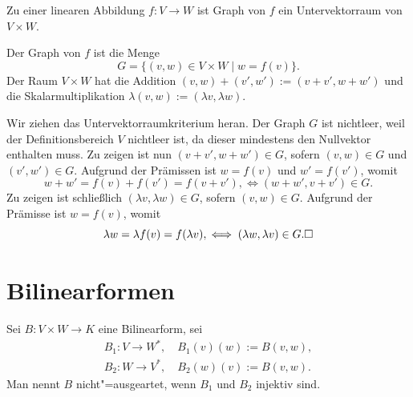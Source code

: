 \begin{Satz}
Zu einer linearen Abbildung $f\colon V\to W$ ist Graph von $f$
ein Untervektorraum von $V\times W$.
\end{Satz}
\begin{Beweis}
Der Graph von $f$ ist die Menge
\[G = \{(v,w)\in V\times W\mid w=f(v)\}.\]
Der Raum $V\times W$ hat die Addition $(v,w)+(v',w'):=(v+v',w+w')$ und
die Skalarmultiplikation $\lambda (v,w) := (\lambda v,\lambda w)$.

Wir ziehen das Untervektorraumkriterium heran. Der Graph $G$ ist
nichtleer, weil der Definitionsbereich $V$ nichtleer ist, da dieser
mindestens den Nullvektor enthalten muss. Zu zeigen ist nun
$(v+v',w+w')\in G$, sofern $(v,w)\in G$ und $(v',w')\in G$. Aufgrund
der Prämissen ist $w=f(v)$ und $w'=f(v')$, womit
\[w+w' = f(v)+f(v') = f(v+v'), \iff (w+w',v+v')\in G.\]
Zu zeigen ist schließlich $(\lambda v,\lambda w)\in G$, sofern
$(v,w)\in G$. Aufgrund der Prämisse ist $w=f(v)$, womit
\[\lambda w = \lambda f(v) = f(\lambda v), \iff (\lambda w,\lambda v)\in G.\square\]
\end{Beweis}

\newpage
\section{Bilinearformen}

\begin{Definition}%
\label{def:degenerate}\newlinefirst
Sei $B\colon V\times W\to K$ eine Bilinearform, sei
\begin{align*}
B_1\colon V\to W^*,\quad B_1(v)(w):=B(v,w),\\
B_2\colon W\to V^*,\quad B_2(w)(v):=B(v,w).
\end{align*}
Man nennt $B$ nicht"=ausgeartet, wenn $B_1$ und $B_2$ injektiv sind.
\end{Definition}

